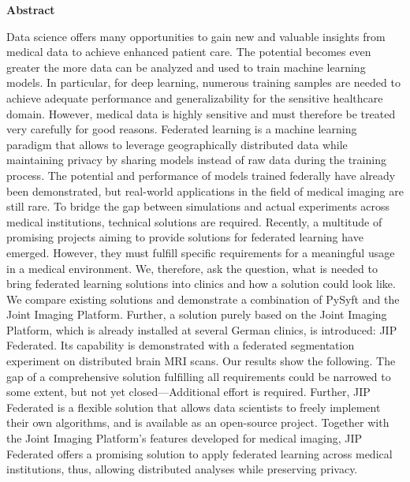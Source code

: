 {\Large \textbf{Abstract}} 

\bigskip

Data science offers many opportunities to gain new and valuable insights from medical data to achieve enhanced patient care. The potential becomes even greater the more data can be analyzed and used to train machine learning models. In particular, for deep learning, numerous training samples are needed to achieve adequate performance and generalizability for the sensitive healthcare domain. However, medical data is highly sensitive and must therefore be treated very carefully for good reasons.
Federated learning is a machine learning paradigm that allows to leverage geographically distributed data while maintaining privacy by sharing models instead of raw data during the training process.
The potential and performance of models trained federally have already been demonstrated, but real-world applications in the field of medical imaging are still rare. To bridge the gap between simulations and actual experiments across medical institutions, technical solutions are required.
Recently, a multitude of promising projects aiming to provide solutions for federated learning have emerged. However, they must fulfill specific requirements for a meaningful usage in a medical environment.
We, therefore, ask the question, what is needed to bring federated learning solutions into clinics and how a solution could look like.
We compare existing solutions and demonstrate a combination of PySyft and the Joint Imaging Platform.
Further, a solution purely based on the Joint Imaging Platform, which is already installed at several German clinics, is introduced: JIP Federated. Its capability is demonstrated with a federated segmentation experiment on distributed brain MRI scans.
Our results show the following.
The gap of a comprehensive solution fulfilling all requirements could be narrowed to some extent, but not yet closed---Additional effort is required.
Further, JIP Federated is a flexible solution that allows data scientists to freely implement their own algorithms, and is available as an open-source project. 
Together with the Joint Imaging Platform's features developed for medical imaging, JIP Federated offers a promising solution to apply federated learning across medical institutions, thus, allowing distributed analyses while preserving privacy.
